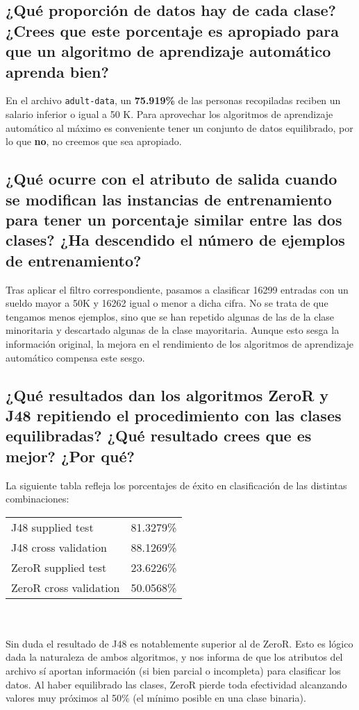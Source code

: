 \documentclass[12pt]{article}
\begin{document}
\subsection*{\small ¿Qué proporción de datos hay de cada clase? ¿Crees que este porcentaje es apropiado para que un algoritmo de aprendizaje automático aprenda bien?}

En el archivo \texttt{adult-data}, un \textbf{75.919\%} de las personas recopiladas reciben un salario inferior o igual a 50 K. Para aprovechar los algoritmos de aprendizaje automático al máximo es conveniente tener un conjunto de datos equilibrado, por lo que \textbf{no}, no creemos que sea apropiado.

\subsection*{\small ¿Qué ocurre con el atributo de salida cuando se modifican las instancias de entrenamiento para tener un porcentaje similar entre las dos clases? ¿Ha descendido el número de ejemplos de entrenamiento?}

Tras aplicar el filtro correspondiente, pasamos a clasificar 16299 entradas con un sueldo mayor a 50K y 16262 igual o menor a dicha cifra. No se trata de que tengamos menos ejemplos, sino que se han repetido algunas de las de la clase minoritaria y descartado algunas de la clase mayoritaria. Aunque esto sesga la información original, la mejora en el rendimiento de los algoritmos de aprendizaje automático compensa este sesgo.

\subsection*{\small ¿Qué resultados dan los algoritmos ZeroR y J48 repitiendo el procedimiento con las clases equilibradas? ¿Qué resultado crees que es mejor? ¿Por qué?}

La siguiente tabla refleja los porcentajes de éxito en clasificación de las distintas combinaciones:\\

\begin{tabular}{ll}
    J48 supplied test & 81.3279\%\\
    J48 cross validation & 88.1269\%\\
    ZeroR supplied test & 23.6226\%\\
    ZeroR cross validation & 50.0568\%\\
\end{tabular}
\\ \\
Sin duda el resultado de J48 es notablemente superior al de ZeroR. Esto es lógico dada la naturaleza de ambos algoritmos, y nos informa de que los atributos del archivo sí aportan información (si bien parcial o incompleta) para clasificar los datos. Al haber equilibrado las clases, ZeroR pierde toda efectividad alcanzando valores muy próximos al 50\% (el mínimo posible en una clase binaria).
\end{document}
